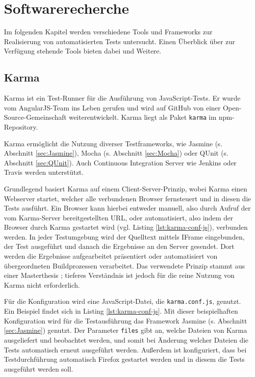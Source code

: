 \section{Softwarerecherche}
Im folgenden Kapitel werden verschiedene Tools und Frameworks zur Realisierung von automatisierten Tests untersucht. Einen Überblick über zur Verfügung stehende Tools bieten dabei \textcite{unittest-overview} und Weitere.

\subsection{Karma}
\label{sec:Karma}
Karma ist ein Test-Runner für die Ausführung von JavaScript-Tests. Er wurde vom AngularJS-Team ins Leben gerufen und wird auf GitHub von einer Open-Source-Gemeinschaft weiterentwickelt.\cite{karma-index} Karma liegt als Paket \texttt{karma} im npm-Repository\cite{karma-faq}.

Karma ermöglicht die Nutzung diverser Testframeworks, wie Jasmine (s. Abschnitt \ref{sec:Jasmine}), Mocha (s. Abschnitt \ref{sec:Mocha}) oder QUnit (s. Abschnitt \ref{sec:QUnit}). Auch Continuous Integration Server wie Jenkins oder Travis werden unterstützt.\cite{karma-faq}

Grundlegend basiert Karma auf einem Client-Server-Prinzip, wobei Karma einen Webserver startet, welcher alle verbundenen Browser fernsteuert und in diesen die Tests ausführt. Ein Browser kann hierbei entweder manuell, also durch Aufruf der vom Karma-Server bereitgestellten URL, oder automatisiert, also indem der Browser durch Karma gestartet wird (vgl. Listing \ref{lst:karma-conf-js}), verbunden werden. In jeder Testumgebung wird der Quelltext mittels IFrame eingebunden, der Test ausgeführt und danach die Ergebnisse an den Server gesendet. Dort werden die Ergebnisse aufgearbeitet präsentiert oder automatisiert von übergeordneten Buildprozessen verarbeitet. Das verwendete Prinzip stammt aus einer Masterthesis \cite{karma-masterThesis}; tieferes Verständnis ist jedoch für die reine Nutzung von Karma nicht erforderlich.\cite{karma-howItWorks}

Für die Konfiguration wird eine JavaScript-Datei, die \texttt{karma.conf.js}, genutzt. Ein Beispiel findet sich in Listing \ref{lst:karma-conf-js}. Mit dieser beispielhaften Konfiguration wird für die Testausführung das Framework Jasmine (s. Abschnitt \ref{sec:Jasmine}) genutzt. Der Parameter \texttt{files} gibt an, welche Dateien von Karma ausgeliefert und beobachtet werden, und somit bei Änderung welcher Dateien die Tests automatisch erneut ausgeführt werden. Außerdem ist konfiguriert, dass bei Testdurchführung automatisch Firefox gestartet werden und in diesem die Tests ausgeführt werden soll.\cite{karma-configurationFile, karma-files}

